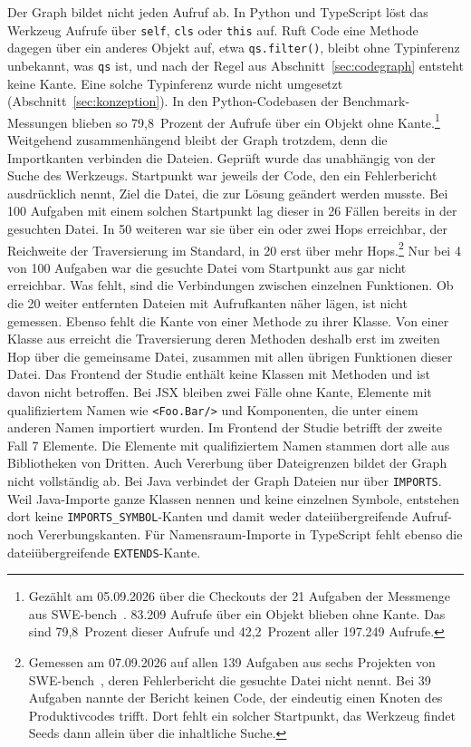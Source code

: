 Der Graph bildet nicht jeden Aufruf ab. In Python und TypeScript löst das Werkzeug Aufrufe über \texttt{self}, \texttt{cls} oder \texttt{this} auf. Ruft Code eine Methode dagegen über ein anderes Objekt auf, etwa \texttt{qs.filter()}, bleibt ohne Typinferenz unbekannt, was \texttt{qs} ist, und nach der Regel aus Abschnitt~\ref{sec:codegraph} entsteht keine Kante. Eine solche Typinferenz wurde nicht umgesetzt (Abschnitt~\ref{sec:konzeption}). In den Python-Codebasen der Benchmark-Messungen blieben so 79,8~Prozent der Aufrufe über ein Objekt ohne Kante.\footnote{Gezählt am 05.09.2026 über die Checkouts der 21 Aufgaben der Messmenge aus SWE-bench~\parencite{jimenez2024swebench}. 83.209 Aufrufe über ein Objekt blieben ohne Kante. Das sind 79,8~Prozent dieser Aufrufe und 42,2~Prozent aller 197.249 Aufrufe.} Weitgehend zusammenhängend bleibt der Graph trotzdem, denn die Importkanten verbinden die Dateien. Geprüft wurde das unabhängig von der Suche des Werkzeugs. Startpunkt war jeweils der Code, den ein Fehlerbericht ausdrücklich nennt, Ziel die Datei, die zur Lösung geändert werden musste. Bei 100 Aufgaben mit einem solchen Startpunkt lag dieser in 26 Fällen bereits in der gesuchten Datei. In 50 weiteren war sie über ein oder zwei Hops erreichbar, der Reichweite der Traversierung im Standard, in 20 erst über mehr Hops.\footnote{Gemessen am 07.09.2026 auf allen 139 Aufgaben aus sechs Projekten von SWE-bench~\parencite{jimenez2024swebench}, deren Fehlerbericht die gesuchte Datei nicht nennt. Bei 39 Aufgaben nannte der Bericht keinen Code, der eindeutig einen Knoten des Produktivcodes trifft. Dort fehlt ein solcher Startpunkt, das Werkzeug findet Seeds dann allein über die inhaltliche Suche.} Nur bei 4 von 100 Aufgaben war die gesuchte Datei vom Startpunkt aus gar nicht erreichbar. Was fehlt, sind die Verbindungen zwischen einzelnen Funktionen. Ob die 20 weiter entfernten Dateien mit Aufrufkanten näher lägen, ist nicht gemessen. Ebenso fehlt die Kante von einer Methode zu ihrer Klasse. Von einer Klasse aus erreicht die Traversierung deren Methoden deshalb erst im zweiten Hop über die gemeinsame Datei, zusammen mit allen übrigen Funktionen dieser Datei. Das Frontend der Studie enthält keine Klassen mit Methoden und ist davon nicht betroffen. Bei JSX bleiben zwei Fälle ohne Kante, Elemente mit qualifiziertem Namen wie \texttt{<Foo.Bar/>} und Komponenten, die unter einem anderen Namen importiert wurden. Im Frontend der Studie betrifft der zweite Fall 7 Elemente. Die Elemente mit qualifiziertem Namen stammen dort alle aus Bibliotheken von Dritten. Auch Vererbung über Dateigrenzen bildet der Graph nicht vollständig ab. Bei Java verbindet der Graph Dateien nur über \texttt{IMPORTS}. Weil Java-Importe ganze Klassen nennen und keine einzelnen Symbole, entstehen dort keine \texttt{IMPORTS\_SYMBOL}-Kanten und damit weder dateiübergreifende Aufruf- noch Vererbungskanten. Für Namensraum-Importe in TypeScript fehlt ebenso die dateiübergreifende \texttt{EXTENDS}-Kante.

